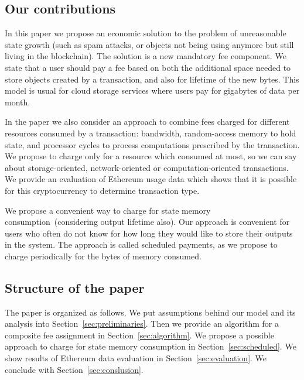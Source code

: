\documentclass[]{llncs}   %
\begin{document}
\subsection{Our contributions}

In this paper we propose an economic solution to the problem of unreasonable state growth
(such as spam attacks, or objects not being using anymore but still living in
the blockchain). The solution is a new mandatory fee component. We state that a
user should pay a fee based on both the additional space needed to store objects
created by a transaction, and also for lifetime of the new bytes. This model is
usual for cloud storage services where users pay for gigabytes of data per
month. 

In the paper we also consider an approach to combine fees charged for different resources consumed by a transaction:
bandwidth, random-access memory to hold state, and processor cycles to process computations prescribed by the transaction.    
We propose to charge only for a resource which consumed at most, so we can say about storage-oriented, network-oriented or computation-oriented transactions. We provide an evaluation of Ethereum usage data which shows that it is possible for this cryptocurrency to determine transaction type.

We propose a convenient way to charge for state memory consumption~(considering output lifetime also). Our approach is convenient for users who often do not know for how long they would like to store their outputs in the system. The approach is called scheduled payments, as we propose to charge periodically for the bytes of memory consumed.






\subsection{Structure of the paper}
The paper is organized as follows. We put assumptions behind our model and its analysis into Section~\ref{sec:preliminaries}. Then we provide an algorithm for a composite fee assignment in Section~\ref{sec:algorithm}. We propose a possible approach to charge for state memory consumption in Section~\ref{sec:scheduled}. We show results of Ethereum data evaluation in Section~\ref{sec:evaluation}. We conclude with Section~\ref{sec:conslusion}.
\end{document}

